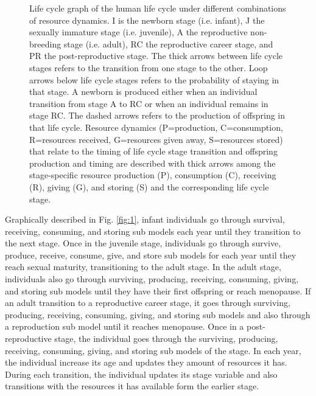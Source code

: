 \documentclass{article}
\begin{document}
\begin{sidewaysfigure}
\begin{figure}[H]
\caption{Life cycle graph of the human life cycle under different combinations of resource dynamics. I is the newborn stage (i.e. infant), J the sexually immature stage (i.e. juvenile), A the reproductive non-breeding stage (i.e. adult), RC the reproductive career stage, and PR the post-reproductive stage. The thick arrows between life cycle stages refers to the transition from one stage to the other. Loop arrows below life cycle stages refers to the probability of staying in that stage. A newborn is produced either when an individual transition from stage A to RC or when an individual remains in stage RC. The dashed arrows refers to the production of offspring in that life cycle. Resource dynamics (P=production, C=consumption, R=resources received, G=resources given away, S=resources stored) that relate to the timing of life cycle stage transition and offspring production and timing are described with thick arrows among the stage-specific resource production (P), consumption (C), receiving (R), giving (G), and storing (S) and the corresponding life cycle stage.}
    \label{fig:2}
\end{figure}
\end{sidewaysfigure}












Graphically described in Fig. \ref{fig:1}, infant individuals go through survival, receiving, consuming, and storing sub models each year until they transition to the next stage. Once in the juvenile stage, individuals go through survive, produce, receive, consume, give, and store sub models for each year until they reach sexual maturity, transitioning to the adult stage. In the adult stage, individuals also go through surviving, producing, receiving, consuming, giving, and storing sub models until they have their first offspring or reach menopause. If an adult transition to a reproductive career stage, it goes through surviving, producing, receiving, consuming, giving, and storing sub models and also through a reproduction sub model until it reaches menopause. Once in a post-reproductive stage, the individual goes through the surviving, producing, receiving, consuming, giving, and storing sub models of the stage. In each year, the individual increase its age and updates they amount of resources it has. During each transition, the individual updates its stage variable and also transitions with the resources it has available form the earlier stage.
\end{document}
